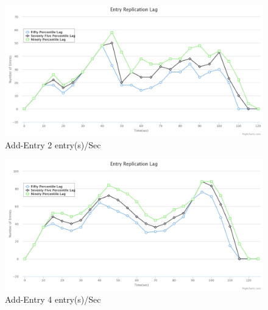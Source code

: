 \documentclass[a4paper,11pt]{kth-mag}
\begin{document}
\begin{figure}[h]
	\includegraphics[scale=0.2]{Add200-2EntryPerSec}
	\caption{Add-Entry 2 entry(s)/Sec}
	\label{fig:addEntry2}
\end{figure}



\begin{figure}[h]
	\includegraphics[scale=0.2]{Add200-4EntryPerSec}
	\caption{Add-Entry 4 entry(s)/Sec}
	\label{fig:addEntry4}
\end{figure}
\end{document}
